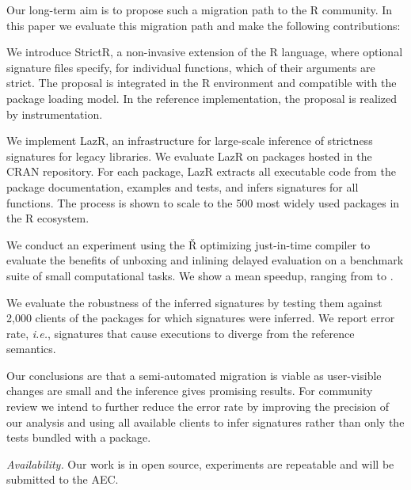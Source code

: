 \documentclass[review,nonacm,screen,acmsmall,anonymous=true]{acmart}
\newcommand{\strictr}{{\sf StrictR}\xspace}
\newcommand{\lazr}{{\sf LazR}\xspace}
\renewcommand{\Rsh}{{\sf\v R}\xspace}
\newcommand{\ie}{\emph{i.e.},\xspace}
\begin{document}
\medskip
\noindent Our long-term aim is to propose such a migration path to the R community. In
this paper we evaluate this migration path and make the following contributions:
\vspace{1mm}

\begin{compactitem}[---]
\item We introduce \strictr, a non-invasive extension of the R language, where
  optional signature files specify, for individual functions, which of their
  arguments are strict. The proposal is integrated in the R environment and
  compatible with the package loading model. In the reference implementation, the
  proposal is realized by instrumentation.
\item We implement \lazr, an infrastructure for large-scale inference of
  strictness signatures for legacy libraries. We evaluate \lazr on packages
  hosted in the CRAN repository. For each package, \lazr extracts all executable
  code from the package documentation, examples and tests, and infers signatures
  for all functions. The process is shown to scale to the 500 most widely used
  packages in the R ecosystem.
\item We conduct an experiment using the \Rsh optimizing just-in-time compiler
  to evaluate the benefits of unboxing and inlining delayed evaluation on a
  benchmark suite of small computational tasks. We show a mean
  \speedupRshStrict speedup, ranging from \speedupRshStrictMin to
  \speedupRshStrictMax.
\item We evaluate the robustness of the inferred signatures by testing them
  against 2,000 clients of the packages for which signatures were inferred. We
  report \robustnesResult error rate, \ie signatures that cause executions to
  diverge from the reference semantics.

\end{compactitem}

\medskip

\noindent Our conclusions are that a semi-automated migration is viable as
user-visible changes are small and the inference gives promising results. For
community review we intend to further reduce the error rate by improving the
precision of our analysis and using all available clients to infer signatures
rather than only the tests bundled with a package.

{\small \medskip\noindent\emph{Availability.} Our work is in open source, experiments are
repeatable and will be submitted to the AEC.}
\end{document}
